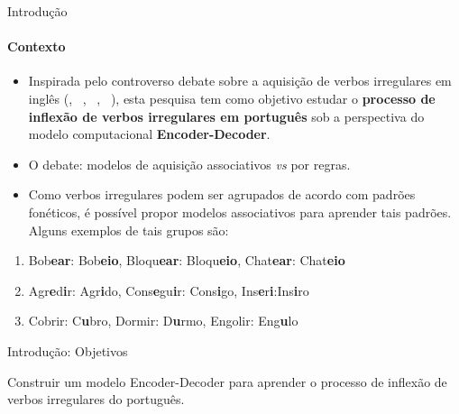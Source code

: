 \begin{frame}{Introdução}
	\framesubtitle{Contexto}
	\begin{itemize}
		\item Inspirada pelo controverso debate sobre a aquisição de verbos irregulares em inglês (\cite{chomsky:1968}, ~\cite{Pinker:1988},
~\cite{Albright2003RulesVA}, ~\cite{kirov:2018}), esta pesquisa tem como objetivo estudar o \textbf{processo de inflexão de verbos irregulares em português} sob a perspectiva do modelo computacional \textbf{Encoder-Decoder}.
		\pause
		\item <1->O debate: modelos de aquisição associativos \textit{vs} por regras.
		\pause
		\item <2->Como verbos irregulares podem ser agrupados de acordo com padrões fonéticos, é possível propor modelos associativos para aprender tais padrões. Alguns exemplos de tais grupos são:
	\end{itemize}
	
	\begin{enumerate}
    \item Bob\textbf{ear}: Bob\textbf{eio}, Bloqu\textbf{ear}: Bloqu\textbf{eio}, Chat\textbf{ear}: Chat\textbf{eio}
    
    \item  Agr\textbf{e}d\textbf{i}r: Agr\textbf{i}do, Cons\textbf{e}gu\textbf{i}r: Cons\textbf{i}go, Ins\textbf{e}r\textbf{i}:Ins\textbf{i}ro
    
    \item Cobrir: C\textbf{u}bro, Dormir: D\textbf{u}rmo, Engolir: Eng\textbf{u}lo
    \end{enumerate}


\end{frame}

\begin{frame}{Introdução: Objetivos}

Construir um modelo Encoder-Decoder para aprender o processo de inflexão de verbos irregulares do português.


\end{frame}

